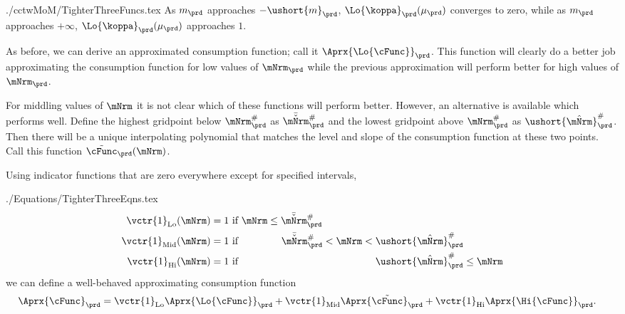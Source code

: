 \documentclass[\econtexRoot/SolvingMicroDSOPs]{subfiles}
\begin{document}
\begin{verbatimwrite}{./cctwMoM/TighterThreeFuncs.tex}
  As $m_{\prd}$ approaches
  $-\ushort{m}_{\prd}$, $\Lo{\koppa}_{\prd}(\mu_{\prd})$ converges to zero, while as $m_{\prd}$
  approaches $+\infty$, $\Lo{\koppa}_{\prd}(\mu_{\prd})$ approaches $1$.

  As before, we can derive an approximated consumption function; call it $\Aprx{\Lo{\cFunc}}_{\prd}$.  This function will clearly do a better job approximating the consumption function for low values of $\mNrm_{\prd}$ while the previous approximation will perform better for high values of $\mNrm_{\prd}$.

  For middling values of $\mNrm$ it is not clear which of these functions will perform better.  However, an alternative is available which performs well.  Define the highest gridpoint below $\mtCusp$ as $\bar{\check{\mNrm}}_{\prd}^{\#}$ and the lowest gridpoint above $\mtCusp$ as $\ushort{\hat{\mNrm}}_{\prd}^{\#}$.  Then there will be a unique interpolating polynomial that matches the level and slope of the consumption function at these two points.  Call this function $\tilde{\cFunc}_{\prd}(\mNrm)$.

  Using indicator functions that are zero everywhere except for specified intervals,
\end{verbatimwrite}
\unskip
\begin{verbatimwrite}{./Equations/TighterThreeEqns.tex}
  \begin{equation*}\begin{gathered}\begin{aligned}
        \vctr{1}_{\text{Lo}}(\mNrm)  & = 1 \text{~if $          \mNrm \leq  \bar{\check{\mNrm}}_{\prd}^{\#} \phantom{< \mNrm <   \ushort{\hat{\mNrm}}_{\prd}^{\#}          \leq \mNrm}$}
        \\  \vctr{1}_{\text{Mid}}(\mNrm)  & = 1 \text{~if $\phantom{ \mNrm \leq}~ \bar{\check{\mNrm}}_{\prd}^{\#}          < \mNrm <   \ushort{\hat{\mNrm}}_{\prd}^{\#} \phantom{\leq \mNrm}$}
        \\  \vctr{1}_{\text{Hi}}(\mNrm)  & = 1 \text{~if $\phantom{ \mNrm \leq  ~\bar{\check{\mNrm}}_{\prd}^{\#}          < \mNrm < } \ushort{\hat{\mNrm}}_{\prd}^{\#}           \leq \mNrm$}
      \end{aligned}\end{gathered}\end{equation*}
  we can define a well-behaved approximating consumption function
  \begin{equation}\begin{gathered}\begin{aligned}
        \Aprx{\cFunc}_{\prd}  & = \vctr{1}_{\text{Lo}} \Aprx{\Lo{\cFunc}}_{\prd} + \vctr{1}_{\text{Mid}} \Aprx{\tilde{\cFunc}}_{\prd}+\vctr{1}_{\text{Hi}} \Aprx{\Hi{\cFunc}}_{\prd}.
      \end{aligned}\end{gathered}\end{equation}
\end{verbatimwrite}
\unskip
\end{document}
